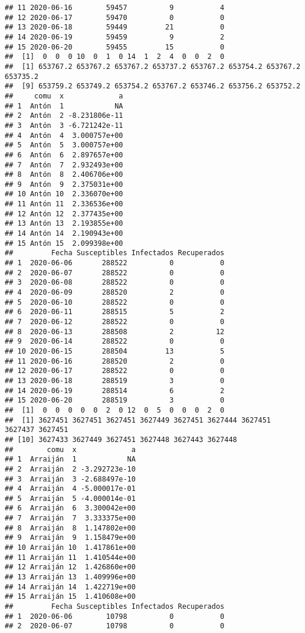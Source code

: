 \documentclass[
]{article}
\begin{document}
\begin{verbatim}
## 11 2020-06-16        59457          9           4
## 12 2020-06-17        59470          0           0
## 13 2020-06-18        59449         21           0
## 14 2020-06-19        59459          9           2
## 15 2020-06-20        59455         15           0
##  [1]  0  0  0 10  0  1  0 14  1  2  4  0  0  2  0
##  [1] 653767.2 653767.2 653767.2 653737.2 653767.2 653754.2 653767.2 653735.2
##  [9] 653759.2 653749.2 653754.2 653767.2 653746.2 653756.2 653752.2
##     comu  x             a
## 1  Antón  1            NA
## 2  Antón  2 -8.231806e-11
## 3  Antón  3 -6.721242e-11
## 4  Antón  4  3.000757e+00
## 5  Antón  5  3.000757e+00
## 6  Antón  6  2.897657e+00
## 7  Antón  7  2.932493e+00
## 8  Antón  8  2.406706e+00
## 9  Antón  9  2.375031e+00
## 10 Antón 10  2.336070e+00
## 11 Antón 11  2.336536e+00
## 12 Antón 12  2.377435e+00
## 13 Antón 13  2.193855e+00
## 14 Antón 14  2.190943e+00
## 15 Antón 15  2.099398e+00
##         Fecha Susceptibles Infectados Recuperados
## 1  2020-06-06       288522          0           0
## 2  2020-06-07       288522          0           0
## 3  2020-06-08       288522          0           0
## 4  2020-06-09       288520          2           0
## 5  2020-06-10       288522          0           0
## 6  2020-06-11       288515          5           2
## 7  2020-06-12       288522          0           0
## 8  2020-06-13       288508          2          12
## 9  2020-06-14       288522          0           0
## 10 2020-06-15       288504         13           5
## 11 2020-06-16       288520          2           0
## 12 2020-06-17       288522          0           0
## 13 2020-06-18       288519          3           0
## 14 2020-06-19       288514          6           2
## 15 2020-06-20       288519          3           0
##  [1]  0  0  0  0  0  2  0 12  0  5  0  0  0  2  0
##  [1] 3627451 3627451 3627451 3627449 3627451 3627444 3627451 3627437 3627451
## [10] 3627433 3627449 3627451 3627448 3627443 3627448
##        comu  x             a
## 1  Arraiján  1            NA
## 2  Arraiján  2 -3.292723e-10
## 3  Arraiján  3 -2.688497e-10
## 4  Arraiján  4 -5.000017e-01
## 5  Arraiján  5 -4.000014e-01
## 6  Arraiján  6  3.300042e+00
## 7  Arraiján  7  3.333375e+00
## 8  Arraiján  8  1.147802e+00
## 9  Arraiján  9  1.158479e+00
## 10 Arraiján 10  1.417861e+00
## 11 Arraiján 11  1.410544e+00
## 12 Arraiján 12  1.426860e+00
## 13 Arraiján 13  1.409996e+00
## 14 Arraiján 14  1.422719e+00
## 15 Arraiján 15  1.410608e+00
##         Fecha Susceptibles Infectados Recuperados
## 1  2020-06-06        10798          0           0
## 2  2020-06-07        10798          0           0

\end{verbatim}
\end{document}

